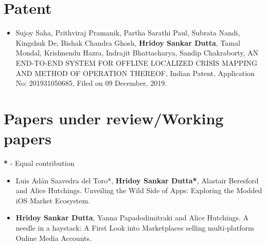\documentclass[margin, centered,lmodern]{res}
\begin{document}
\begin{resume}
\section{Patent}
\begin{itemize}[leftmargin=*]

\item Sujoy Saha,  Prithviraj Pramanik,  Partha Sarathi Paul,  Subrata Nandi,  Kingshuk De,  Bishak Chandra Ghosh,  \textbf{Hridoy Sankar Dutta},  Tamal Mondal,  Krishnendu Hazra,  Indrajit Bhattacharya,  Sandip Chakraborty,  AN END-TO-END SYSTEM FOR OFFLINE LOCALIZED CRISIS MAPPING AND METHOD OF OPERATION THEREOF,  Indian Patent,  Application No: 201931050685,  Filed on 09 December, 2019.

\end{itemize}

\section{Papers under review/Working papers}
\textbf{*} - Equal contribution
\begin{itemize}[leftmargin=*]
\item Luis Adán Saavedra del Toro*,  \textbf{Hridoy Sankar Dutta*}, Alastair Beresford and Alice Hutchings.  Unveiling the Wild Side of Apps: Exploring the Modded iOS Market Ecosystem.

\item \textbf{Hridoy Sankar Dutta},  Yanna Papadodimitraki and Alice Hutchings.  A needle in a haystack: A First Look into Marketplaces selling multi-platform Online Media Accounts.

\end{itemize}



\end{resume}
\end{document}
